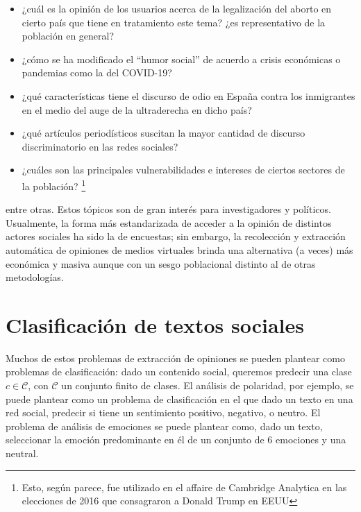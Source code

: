\begin{itemize}
    \item ¿cuál es la opinión de los usuarios acerca de la legalización del aborto en cierto país que tiene en tratamiento este tema? ¿es representativo de la población en general? \cite{graells2019abortion}
    \item ¿cómo se ha modificado el ``humor social'' de acuerdo a crisis económicas o pandemias como la del COVID-19? \cite{brufau2020emotion}
    \item ¿qué características tiene el discurso de odio en España contra los inmigrantes en el medio del auge de la ultraderecha en dicho país? \cite{calderon2020topic}
    \item ¿qué artículos periodísticos suscitan la mayor cantidad de discurso discriminatorio en las redes sociales?
    \item ¿cuáles son las principales vulnerabilidades e intereses de ciertos sectores de la población? \cite{zuiderveen2018online} \footnote{Esto, según parece, fue utilizado en el affaire de Cambridge Analytica en las elecciones de 2016 que consagraron a Donald Trump en EEUU}
\end{itemize}

entre otras. Estos tópicos son de gran interés para investigadores y políticos. Usualmente, la forma más estandarizada de acceder a la opinión de distintos actores sociales ha sido la de encuestas; sin embargo, la recolección y extracción automática de opiniones de medios virtuales brinda una alternativa (a veces) más económica y masiva aunque con un sesgo poblacional distinto al de otras metodologías.

\section{Clasificación de textos sociales}

Muchos de estos problemas de extracción de opiniones se pueden plantear como problemas de clasificación\cite{pang2008opinion}: dado un contenido social, queremos predecir una clase $c \in \mathcal{C}$, con $\mathcal{C}$ un conjunto finito de clases. El análisis de polaridad, por ejemplo, se puede plantear como un problema de clasificación en el que dado un texto en una red social, predecir si tiene un sentimiento positivo, negativo, o neutro. El problema de análisis de emociones se puede plantear como, dado un texto, seleccionar la emoción predominante en él de un conjunto de 6 emociones y una neutral.

